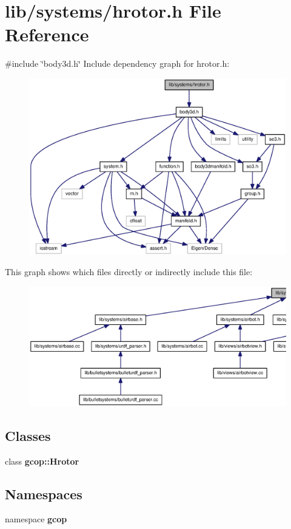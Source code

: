 \section{lib/systems/hrotor.h \-File \-Reference}
\label{hrotor_8h}
{\ttfamily \#include \char`\"{}body3d.\-h\char`\"{}}\*
\-Include dependency graph for hrotor.\-h\-:
\nopagebreak
\begin{figure}[H]
\begin{center}
\leavevmode
\includegraphics[width=350pt]{hrotor_8h__incl}
\end{center}
\end{figure}
\-This graph shows which files directly or indirectly include this file\-:
\nopagebreak
\begin{figure}[H]
\begin{center}
\leavevmode
\includegraphics[width=350pt]{hrotor_8h__dep__incl}
\end{center}
\end{figure}
\subsection*{\-Classes}
\begin{DoxyCompactItemize}
\item 
class {\bf gcop\-::\-Hrotor}
\end{DoxyCompactItemize}
\subsection*{\-Namespaces}
\begin{DoxyCompactItemize}
\item 
namespace {\bf gcop}
\end{DoxyCompactItemize}
